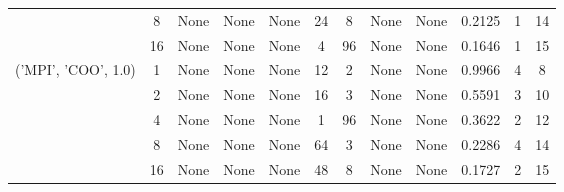 \begin{tabular}{cccccccccccc}
& 8& None& None& None& 24& 8& None& None& 0.2125& 1& 14\\
& 16& None& None& None& 4& 96& None& None& 0.1646& 1& 15\\
\hline
\multirow{5}{*}{('MPI', 'COO', 1.0)}& 1& None& None& None& 12& 2& None& None& 0.9966& 4& 8\\
& 2& None& None& None& 16& 3& None& None& 0.5591& 3& 10\\
& 4& None& None& None& 1& 96& None& None& 0.3622& 2& 12\\
& 8& None& None& None& 64& 3& None& None& 0.2286& 4& 14\\
& 16& None& None& None& 48& 8& None& None& 0.1727& 2& 15\\
\hline
\end{tabular}



